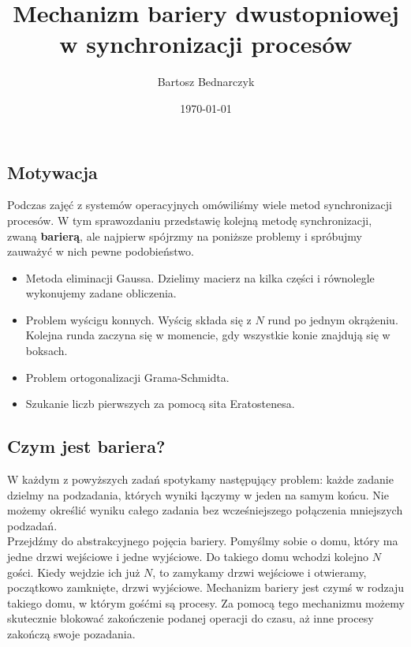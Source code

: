 \documentclass{article}
\begin{document}
 
\title{Mechanizm bariery dwustopniowej w synchronizacji procesów}
\date{\today}
\author{Bartosz Bednarczyk}
 
\maketitle
 
\subsection*{Motywacja}
 
Podczas zajęć z systemów operacyjnych omówiliśmy wiele metod synchronizacji procesów. W tym sprawozdaniu przedstawię kolejną metodę synchronizacji, zwaną \textbf{barierą}, ale najpierw spójrzmy na poniższe problemy i spróbujmy zauważyć w nich pewne podobieństwo.
 
\begin{itemize}
\item Metoda eliminacji Gaussa. Dzielimy macierz na kilka części i równolegle wykonujemy zadane obliczenia.
\item Problem wyścigu konnych. Wyścig składa się z $N$ rund po jednym okrążeniu. Kolejna runda zaczyna się w momencie, gdy wszystkie konie znajdują się w boksach.
\item Problem ortogonalizacji Grama-Schmidta.
\item Szukanie liczb pierwszych za pomocą sita Eratostenesa.
\end{itemize}
 
\subsection*{Czym jest bariera?}
 
W każdym z powyższych zadań spotykamy następujący problem: każde zadanie dzielmy na podzadania, których wyniki łączymy w jeden na samym końcu. Nie możemy określić wyniku całego zadania bez wcześniejszego połączenia mniejszych podzadań.\\
 
Przejdźmy do abstrakcyjnego pojęcia bariery. Pomyślmy sobie o domu, który ma jedne drzwi wejściowe i jedne wyjściowe. Do takiego domu wchodzi kolejno $N$ gości. Kiedy wejdzie ich już $N$, to zamykamy drzwi wejściowe i otwieramy, początkowo zamknięte, drzwi wyjściowe. Mechanizm bariery jest czymś w rodzaju takiego domu, w którym gośćmi są procesy. Za pomocą tego mechanizmu możemy skutecznie blokować zakończenie podanej operacji do czasu, aż inne procesy zakończą swoje pozadania.
 
\end{document}
